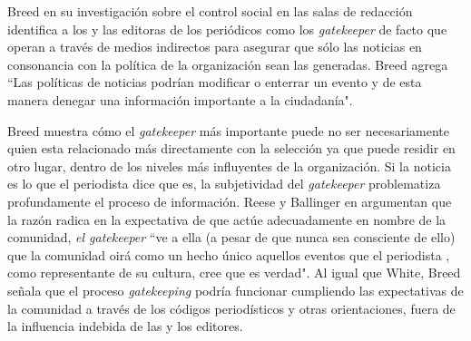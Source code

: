  Breed en su investigación sobre el control social en las salas de redacción \cite{breed1955social} identifica a los y las editoras de los periódicos como los \emph{gatekeeper} de facto que operan a través de medios indirectos para asegurar que sólo las noticias en consonancia con la política de la organización sean las generadas. Breed agrega ``Las políticas de noticias podrían modificar o enterrar un evento y de esta manera denegar una información importante a la ciudadanía".


Breed muestra cómo el \emph{gatekeeper} más importante puede no ser necesariamente quien esta relacionado más directamente con la selección ya que puede residir en otro lugar, dentro de los niveles más influyentes de la organización. Si la noticia es lo que el periodista dice que es, la subjetividad del \emph{gatekeeper} problematiza profundamente el proceso de información. Reese y Ballinger en \cite{13213947} argumentan que la razón radica en la expectativa de que actúe adecuadamente en nombre de la comunidad, \emph{el gatekeeper} ``ve a ella (a pesar de que nunca sea consciente de ello) que la comunidad oirá como un hecho único aquellos eventos que el periodista , como representante de su cultura, cree que es verdad". Al igual que White, Breed señala que el proceso \emph{gatekeeping} podría funcionar cumpliendo las expectativas de la comunidad a través de los códigos periodísticos y otras orientaciones, fuera de la influencia indebida de las y los editores. 


